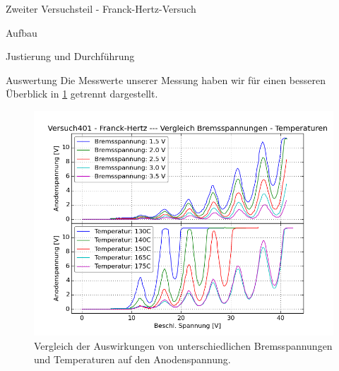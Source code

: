 \documentclass[pdftex, a4paper,11pt, twoside, ngerman]{report}
\begin{document}
  \begin{chapter}{Zweiter Versuchsteil - Franck-Hertz-Versuch}
    \label{chp:Balmer}
 
 
    \begin{section}{Aufbau}
      \label{chp:Balmer:sec:Aufbau}
      
      
    \end{section}
   
   
   
    \begin{section}{Justierung und Durchführung}
      \label{chp:FH:sec:JusitierungDurchfuehrung}
      
      
    \end{section}
    
    
    
    \newpage
    \begin{section}{Auswertung}
      \label{chp:FH:sec:Auswertung}
      Die Messwerte unserer Messung haben wir für einen besseren Überblick in
      \cref{fig:FHvergleich} getrennt dargestellt.
      \begin{figure}[ht]
        \centering
        \includegraphics[width=\textwidth]
    {Figures/Versuch401-Franck-Hertz-VergleichBremsspannungen-Temperaturen.png}
        \caption{Vergleich der Auswirkungen von unterschiedlichen
            Bremsspannungen und Temperaturen auf den Anodenspannung.}
        \label{fig:FHvergleich}
      \end{figure}
      

\end{section}
\end{chapter}
\end{document}
